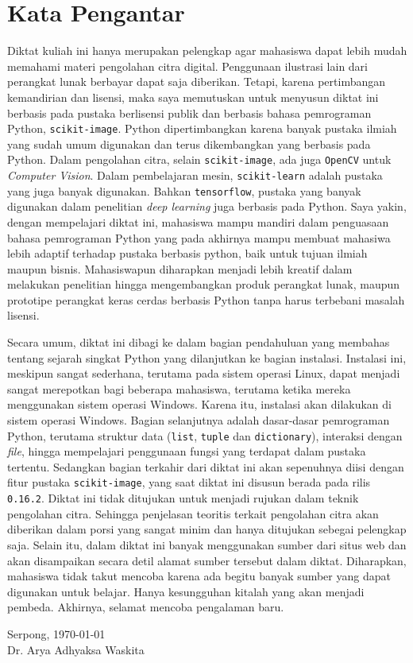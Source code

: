 \chapter*{Kata Pengantar}
Diktat kuliah ini hanya merupakan pelengkap agar mahasiswa dapat lebih mudah memahami materi pengolahan citra digital. Penggunaan ilustrasi lain dari perangkat lunak berbayar dapat saja diberikan. Tetapi, karena pertimbangan kemandirian dan lisensi, maka saya memutuskan untuk menyusun diktat ini berbasis pada pustaka berlisensi publik dan berbasis bahasa pemrograman Python, \texttt{scikit-image}. Python dipertimbangkan karena banyak pustaka ilmiah yang sudah umum digunakan dan terus dikembangkan yang berbasis pada Python. Dalam pengolahan citra, selain \texttt{scikit-image}, ada juga \texttt{OpenCV} untuk \textit{Computer Vision}. Dalam pembelajaran mesin, \texttt{scikit-learn} adalah pustaka yang juga banyak digunakan. Bahkan \texttt{tensorflow}, pustaka yang banyak digunakan dalam penelitian \textit{deep learning} juga berbasis pada Python. Saya yakin, dengan mempelajari diktat ini, mahasiswa mampu mandiri dalam penguasaan bahasa pemrograman Python yang pada akhirnya mampu membuat mahasiwa lebih adaptif terhadap pustaka berbasis python, baik untuk tujuan ilmiah maupun bisnis. Mahasiswapun diharapkan menjadi lebih kreatif dalam melakukan penelitian hingga mengembangkan produk perangkat lunak, maupun prototipe perangkat keras cerdas berbasis Python tanpa harus terbebani masalah lisensi.

Secara umum, diktat ini dibagi ke dalam bagian pendahuluan yang membahas tentang sejarah singkat Python yang dilanjutkan ke bagian instalasi. Instalasi ini, meskipun sangat sederhana, terutama pada sistem operasi Linux, dapat menjadi sangat merepotkan bagi beberapa mahasiswa, terutama ketika mereka menggunakan sistem operasi Windows. Karena itu, instalasi akan dilakukan di sistem operasi Windows. Bagian selanjutnya adalah dasar-dasar pemrograman Python, terutama struktur data (\texttt{list}, \texttt{tuple} dan \texttt{dictionary}), interaksi dengan \textit{file}, hingga mempelajari penggunaan fungsi yang terdapat dalam pustaka tertentu. Sedangkan bagian terkahir dari diktat ini akan sepenuhnya diisi dengan fitur pustaka \texttt{scikit-image}, yang saat diktat ini disusun berada pada rilis \texttt{0.16.2}.
\clearpage
Diktat ini tidak ditujukan untuk menjadi rujukan dalam teknik pengolahan citra. Sehingga penjelasan teoritis terkait pengolahan citra akan diberikan dalam porsi yang sangat minim dan hanya ditujukan sebegai pelengkap saja. Selain itu, dalam diktat ini banyak menggunakan sumber dari situs web dan akan disampaikan secara detil alamat sumber tersebut dalam diktat. Diharapkan, mahasiswa tidak takut mencoba karena ada begitu banyak sumber yang dapat digunakan untuk belajar. Hanya kesungguhan kitalah yang akan menjadi pembeda. Akhirnya, selamat mencoba pengalaman baru. 

\vspace*{2cm}
\begin{flushright}
Serpong, \today\\[0.1cm]
\vspace*{1cm}
Dr. Arya Adhyaksa Waskita

\end{flushright}
